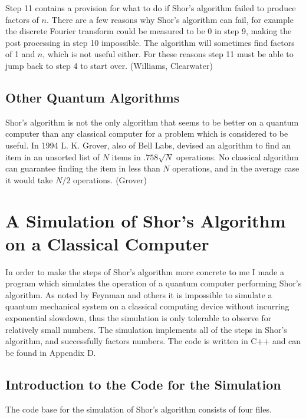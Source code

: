 \documentclass[]{article}
\begin{document}
Step 11 contains a provision for what to do if Shor's algorithm failed
to produce factors of $n$.  There are a few reasons why Shor's
algorithm can fail, for example the discrete Fourier transform could
be measured to be 0 in step 9, making the post processing in step 10
impossible.  The algorithm will sometimes find factors of 1 and $n$,
which is not useful either.  For these reasons step 11 must be able to
jump back to step 4 to start over.  (Williams, Clearwater)

\subsection{Other Quantum Algorithms}

Shor's algorithm is not the only algorithm that seems to be better on
a quantum computer than any classical computer for a problem which is
considered to be useful.  In 1994 L. K. Grover, also of Bell Labs,
devised an algorithm to find an item in an unsorted list of $N$ items
in $.758\sqrt{N}$ operations.  No classical algorithm can guarantee
finding the item in less than $N$ operations, and in the average case
it would take $N/2$ operations.  (Grover)

\section{A Simulation of Shor's Algorithm on a Classical Computer}

In order to make the steps of Shor's algorithm more concrete to me I
made a program which simulates the operation of a quantum computer
performing Shor's algorithm.  As noted by Feynman and others it is
impossible to simulate a quantum mechanical system on a classical
computing device without incurring exponential slowdown, thus the
simulation is only tolerable to observe for relatively small numbers.
The simulation implements all of the steps in Shor's algorithm, and
successfully factors numbers.  The code is written in C++ and can be
found in Appendix D.

\subsection{Introduction to the Code for the Simulation}

The code base for the simulation of Shor's algorithm consists of four
files.
\end{document}
